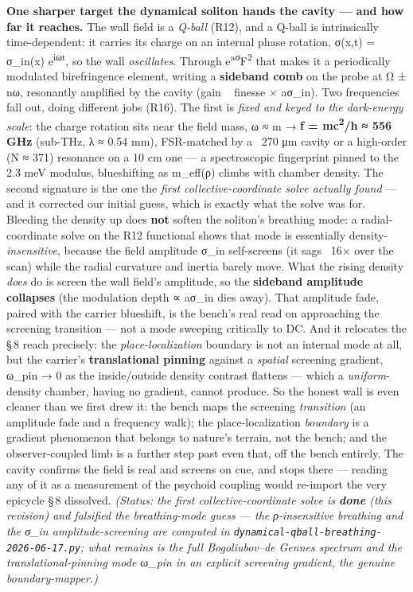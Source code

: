 \documentclass[11pt]{article}
\begin{document}
\textbf{One sharper target the dynamical soliton hands the cavity --- and how far it reaches.} The wall field is a \emph{Q-ball} (R12), and a Q-ball is intrinsically time-dependent: it carries its charge on an internal phase rotation, σ(x,t) = σ\_in(x) e\textsuperscript{iωt}, so the wall \emph{oscillates}. Through e\textsuperscript{aσ}F\textsuperscript{2} that makes it a periodically modulated birefringence element, writing a \textbf{sideband comb} on the probe at Ω ± nω, resonantly amplified by the cavity (gain ~ finesse × aσ\_in). Two frequencies fall out, doing different jobs (R16). The first is \emph{fixed and keyed to the dark-energy scale}: the charge rotation sits near the field mass, ω ≈ m → \textbf{f = mc\textsuperscript{2}/h ≈ 556 GHz} (sub-THz, λ ≈ 0.54 mm), FSR-matched by a ~270 μm cavity or a high-order (N ≈ 371) resonance on a 10 cm one --- a spectroscopic fingerprint pinned to the 2.3 meV modulus, blueshifting as m\_eff(ρ) climbs with chamber density. The second signature is the one the \emph{first collective-coordinate solve actually found} --- and it corrected our initial guess, which is exactly what the solve was for. Bleeding the density up does \textbf{not} soften the soliton's breathing mode: a radial-coordinate solve on the R12 functional shows that mode is essentially density-\emph{insensitive}, because the field amplitude σ\_in self-screens (it sags ~16× over the scan) while the radial curvature and inertia barely move. What the rising density \emph{does} do is screen the wall field's amplitude, so the \textbf{sideband amplitude collapses} (the modulation depth ∝ aσ\_in dies away). That amplitude fade, paired with the carrier blueshift, is the bench's real read on approaching the screening transition --- not a mode sweeping critically to DC. And it relocates the \S\,8 reach precisely: the \emph{place-localization} boundary is not an internal mode at all, but the carrier's \textbf{translational pinning} against a \emph{spatial} screening gradient, ω\_pin → 0 as the inside/outside density contrast flattens --- which a \emph{uniform}-density chamber, having no gradient, cannot produce. So the honest wall is even cleaner than we first drew it: the bench maps the screening \emph{transition} (an amplitude fade and a frequency walk); the place-localization \emph{boundary} is a gradient phenomenon that belongs to nature's terrain, not the bench; and the observer-coupled limb is a further step past even that, off the bench entirely. The cavity confirms the field is real and screens on cue, and stops there --- reading any of it as a measurement of the psychoid coupling would re-import the very epicycle \S\,8 dissolved. \emph{(Status: the first collective-coordinate solve is \textbf{done} (this revision) and falsified the breathing-mode guess --- the ρ-insensitive breathing and the σ\_in amplitude-screening are computed in \texttt{dynamical-qball-breathing-2026-06-17.py}; what remains is the full Bogoliubov--de Gennes spectrum and the translational-pinning mode ω\_pin in an explicit screening gradient, the genuine boundary-mapper.)}
\end{document}
